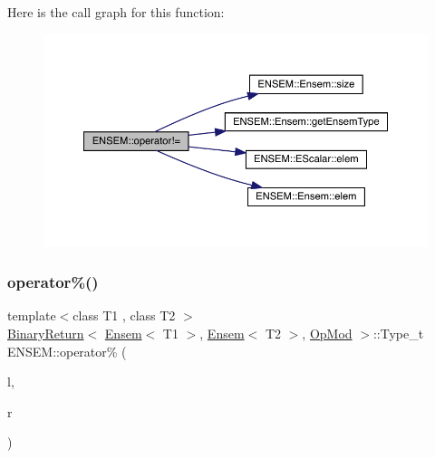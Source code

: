Here is the call graph for this function\+:\nopagebreak
\begin{figure}[H]
\begin{center}
\leavevmode
\includegraphics[width=350pt]{d1/d9e/group__eensem_ga312278f2450b3a4afdfd443566c93d0a_cgraph}
\end{center}
\end{figure}
\mbox{\label{group__eensem_gaf077fbdf11a765fcbfe7fbb3b9e94a02}} 
\subsubsection{\texorpdfstring{operator\%()}{operator\%()}\hspace{0.1cm}{\footnotesize\ttfamily [1/3]}}
{\footnotesize\ttfamily template$<$class T1 , class T2 $>$ \\
\mbox{\hyperlink{structENSEM_1_1BinaryReturn}{Binary\+Return}}$<$ \mbox{\hyperlink{classENSEM_1_1Ensem}{Ensem}}$<$ T1 $>$, \mbox{\hyperlink{classENSEM_1_1Ensem}{Ensem}}$<$ T2 $>$, \mbox{\hyperlink{structENSEM_1_1OpMod}{Op\+Mod}} $>$\+::Type\+\_\+t E\+N\+S\+E\+M\+::operator\% (\begin{DoxyParamCaption}\item[{const \mbox{\hyperlink{classENSEM_1_1Ensem}{Ensem}}$<$ T1 $>$ \&}]{l,  }\item[{const \mbox{\hyperlink{classENSEM_1_1Ensem}{Ensem}}$<$ T2 $>$ \&}]{r }\end{DoxyParamCaption})\hspace{0.3cm}{\ttfamily [inline]}}

